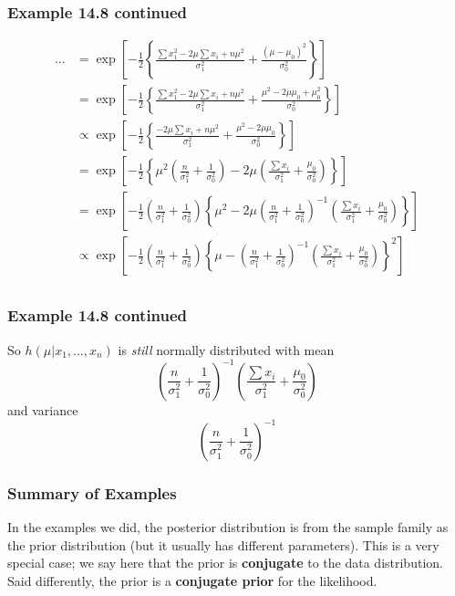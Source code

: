 \documentclass{beamer}
\begin{document}
\begin{frame}
\frametitle{Example 14.8 continued}

\begin{align*}
\ldots &= \exp\left[-\frac{1}{2}\left\{ \frac{\sum x_1^2 - 2\mu \sum x_i + n\mu^2}{\sigma_1^2} + \frac{(\mu - \mu_0)^2}{ \sigma_0^2} \right\} \right] \\
&= \exp\left[-\frac{1}{2}\left\{ \frac{\sum x_1^2 - 2\mu \sum x_i + n\mu^2}{\sigma_1^2} + \frac{\mu^2 - 2\mu\mu_0 +\mu_0^2}{ \sigma_0^2} \right\} \right] \\
&\propto \exp\left[-\frac{1}{2}\left\{ \frac{- 2\mu \sum x_i + n\mu^2}{\sigma_1^2} + \frac{\mu^2 - 2\mu\mu_0 }{ \sigma_0^2} \right\} \right] \\
&= \exp\left[-\frac{1}{2}\left\{ \mu^2 \left(\frac{n}{\sigma_1^2} + \frac{1}{\sigma_0^2} \right) - 2 \mu\left( \frac{\sum x_i}{\sigma_1^2} + \frac{\mu_0}{\sigma_0^2} \right) \right\} \right] \\
&= \exp\left[-\frac{1}{2}\left(\frac{n}{\sigma_1^2} + \frac{1}{\sigma_0^2} \right) \left\{ \mu^2  - 2 \mu\left(\frac{n}{\sigma_1^2} + \frac{1}{\sigma_0^2} \right)^{-1}\left( \frac{\sum x_i}{\sigma_1^2} + \frac{\mu_0}{\sigma_0^2} \right) \right\} \right] \\
&\propto \exp\left[-\frac{1}{2}\left(\frac{n}{\sigma_1^2} + \frac{1}{\sigma_0^2} \right) 
\left\{ \mu  - \left(\frac{n}{\sigma_1^2} + \frac{1}{\sigma_0^2} \right)^{-1}\left( \frac{\sum x_i}{\sigma_1^2} + \frac{\mu_0}{\sigma_0^2} \right) \right\}^2 
\right] \\
\end{align*}

\end{frame}

\begin{frame}
\frametitle{Example 14.8 continued}

So $h(\mu | x_1, \ldots, x_n)$ is \emph{still} normally distributed with  mean
\[
\left(\frac{n}{\sigma_1^2} + \frac{1}{\sigma_0^2} \right)^{-1}\left( \frac{\sum x_i}{\sigma_1^2} + \frac{\mu_0}{\sigma_0^2} \right)
\]
and variance
\[
\left(\frac{n}{\sigma_1^2} + \frac{1}{\sigma_0^2} \right) ^{-1}
\]

\end{frame}

\begin{frame}
\frametitle{Summary of Examples}

In the examples we did, the posterior distribution is from the sample family as the prior distribution (but it usually has different parameters). This is a very special case; we say here that the prior is {\bf conjugate} to the data distribution. Said differently, the prior is a {\bf conjugate prior} for the likelihood.


\end{frame}
\end{document}
